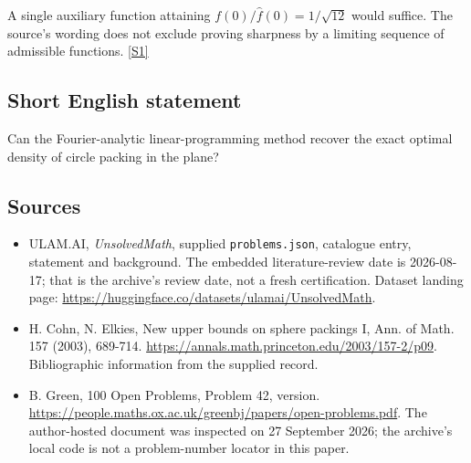 \documentclass[11pt,a4paper]{article}
\newcommand{\sref}[2]{\hyperlink{source:#1:#2}{[S#2]}}
\begin{document}
A single auxiliary function attaining $f(0)/\widehat f(0)=1/\sqrt{12}$ would suffice. The source’s wording does not exclude proving sharpness by a limiting sequence of admissible functions. \sref{statement}{1}

\subsection{Short English statement}

Can the Fourier-analytic linear-programming method recover the exact optimal density of circle packing in the plane?

\subsection{Sources}

{\small

\begin{itemize}

\item[\hypertarget{source:statement:1}{S1}] ULAM.AI, \emph{UnsolvedMath}, supplied \texttt{problems.json}, catalogue entry, statement and background. The embedded literature-review date is 2026-08-17; that is the archive’s review date, not a fresh certification. Dataset landing page: \url{https://huggingface.co/datasets/ulamai/UnsolvedMath}.

\item[\hypertarget{source:statement:2}{S2}] H. Cohn, N. Elkies, New upper bounds on sphere packings I, Ann. of Math. 157 (2003), 689-714. \url{https://annals.math.princeton.edu/2003/157-2/p09}. Bibliographic information from the supplied record.

\item[\hypertarget{source:statement:3}{S3}] B. Green, 100 Open Problems, Problem 42, version. \url{https://people.maths.ox.ac.uk/greenbj/papers/open-problems.pdf}. The author-hosted document was inspected on 27 September 2026; the archive’s local code is not a problem-number locator in this paper.

\end{itemize}

}

\label{end:statement}
\end{document}
